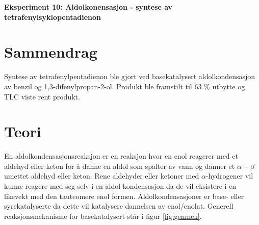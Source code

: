 \begin{center}
\LARGE{\textbf{Eksperiment 10: Aldolkonensasjon - syntese av tetrafenylsyklopentadienon}}
\end{center}

\section*{Sammendrag}

Syntese av tetrafenylpentadienon ble gjort ved basekatalysert aldolkondensasjon av benzil og 1,3-difenylpropan-2-ol. Produkt ble framstilt til 63 \% utbytte og TLC viste rent produkt.


\section{Teori}

En  aldolkondensasjonsreaksjon er en reaksjon hvor en enol reagerer med et aldehyd eller keton for å danne en aldol som spalter av vann og danner et $\alpha-\beta$ umettet aldehyd eller keton\cite{OrganicChemistry}. Rene aldehyder eller ketoner med $\alpha$-hydrogener vil kunne reagere med seg selv i en aldol kondensasjon da de vil eksistere i en likevekt med den tauteomere enol formen. Aldolkondensasjoner er base- eller syrekatalyserte da dette vil katalysere dannelsen av enol/enolat. Generell reaksjonsmekanisme for basekatalysert står i figur \ref{fig:genmek}.


